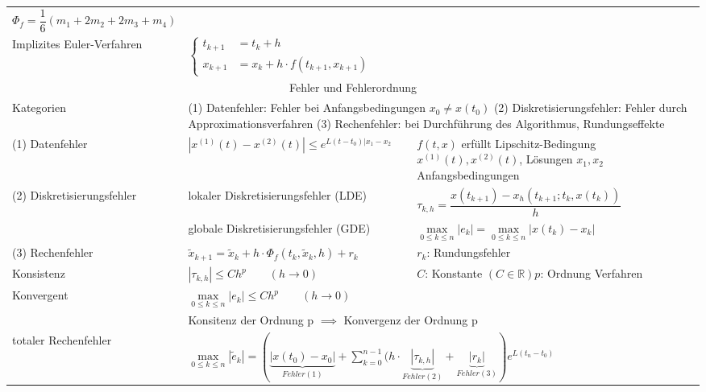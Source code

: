 \begin{tabularx}{\columnwidth}{p{2.8cm}XX}
	$\Phi_f = \dfrac{1}{6}(m_1 + 2m_2 + 2m_3 + m_4)$\\
	\hdashline
	Implizites Euler-Verfahren & $\begin{cases} t_{k+1} &= t_k + h\\ x_{k+1} &= x_k + h\cdot f(t_{k+1}, x_{k+1})\end{cases}$\\
	\hline 
	\multicolumn{3}{c}{Fehler und Fehlerordnung}\\
	\hdashline 
	Kategorien & \multicolumn{2}{p{13cm}}{
	(1)   Datenfehler: Fehler bei Anfangsbedingungen $x_0 \neq x(t_0)$  \newline 
	(2)  Diskretisierungsfehler: Fehler durch Approximationsverfahren\newline
	(3) Rechenfehler: bei Durchführung des Algorithmus, Rundungseffekte}\\
	\hdashline 
	(1) Datenfehler & 
	$|x^{(1)}(t) - x^{(2)}(t)| \leq e^{L(t-t_0) |x_1-x_2}$&
	$f(t,x)$ erfüllt Lipschitz-Bedingung\newline $x^{(1)}(t),x^{(2)}(t)$, Lösungen\newline
	$x_1,x_2$  Anfangsbedingungen\\
	(2) Diskretisierungsfehler & lokaler Diskretisierungsfehler (LDE)  & $\tau_{k,h} = \dfrac{x(t_{k+1}) - x_h(t_{k+1};t_k,x(t_k))}{h}$\\
	 &globale Diskretisierungsfehler (GDE)&
	 $\max\limits_{0\leq k\leq n}|e_k| = \max\limits_{0\leq k\leq n}|x(t_k) - x_k|$\\
	 (3) Rechenfehler & $\tilde x_{k+1} = \tilde x_k + h\cdot \Phi_f(t_k,\tilde x_k,h) + r_k$ & $r_k$: Rundungsfehler\\
	 \hdashline
	 Konsistenz & $|\tau_{k,h}| \leq Ch^p\qquad  (h\to 0)$ & $C$: Konstante $(C\in\mathbb{R})$\newline $p$: Ordnung Verfahren\\
	 Konvergent & $\max\limits_{0\leq k\leq n} |e_k| \leq Ch^p \qquad (h\to 0)$ &\\
	  & \multicolumn{2}{l}{Konsitenz der Ordnung p $\implies$ Konvergenz der Ordnung p}\\
	 \hdashline 
	 totaler Rechenfehler & \multicolumn{2}{l}{$\max\limits_{0\leq k\leq n} |\tilde{e}_k| = \left( \underbrace{|x(t_0) - x_0|}_{Fehler (1)} + \sum\limits_{k=0}^{n-1} (h\cdot \underbrace{|\tau_{k,h}|}_{Fehler (2)} +  \underbrace{|r_k|}_{Fehler (3)}   \right) e^{L(t_n-t_0)}$}\\
	 \hline 
\end{tabularx} 

\renewcommand{\arraystretch}{2}